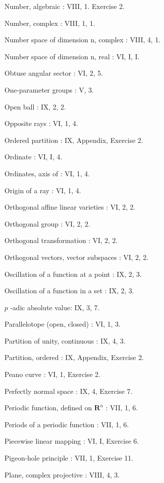 Number, algebraic : VIII, 1. Exercise 2.

Number, complex : VIII, 1, 1.

Number space of dimension n, complex : VIII, 4, 1.

Number space of dimension n, real : VI, I, I.

Obtuse angular sector : VI, 2, 5.

One-parameter groups : V, 3.

Open ball : IX, 2, 2.

Opposite rays : VI, 1, 4.

Ordered partition : IX, Appendix, Exercise 2.

Ordinate : VI, I, 4.

Ordinates, axis of : VI, 1, 4.

Origin of a ray : VI, 1, 4.

Orthogonal affine linear varieties : VI, 2, 2.

Orthogonal group : VI, 2, 2.

Orthogonal transformation : VI, 2, 2.

Orthogonal vectors, vector subspaces : VI, 2, 2.

Oscillation of a function at a point : IX, 2, 3.

Oscillation of a function in a set : IX, 2, 3.

\(p\) -adic absolute value: IX, 3, 7.

Parallelotope (open, closed) : VI, 1, 3.

Partition of unity, continuous : IX, 4, 3.

Partition, ordered : IX, Appendix, Exercise 2.

Peano curve : VI, 1, Exercise 2.

Perfectly normal space : IX, 4, Exercise 7.

Periodic function, defined on \(\mathbf{R}^n\) : VII, 1, 6.

Periods of a periodic function : VII, 1, 6.

Piecewise linear mapping : VI, I, Exercise 6.

Pigeon-hole principle : VII, 1, Exercise 11.

Plane, complex projective : VIII, 4, 3.


